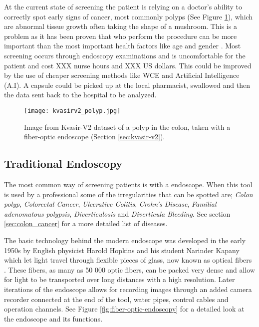 \documentclass[thesis.tex]{subfiles}
\begin{document}
At the current state of screening the patient is relying on a doctor's ability to correctly spot early signs of cancer, most commonly polyps (See Figure \ref{fig:kvasirv2_polyp}), which are abnormal tissue growth often taking the shape of a mushroom. This is a problem as it has been proven that who perform the procedure can be more important than the most important health factors like age and gender \cite{EndoscopistCan07}. Most screening occurs through endoscopy examinations and is uncomfortable for the patient and cost XXX nurse hours and XXX US dollars. %
This could be improved by the use of cheaper screening methods like WCE and Artificial Intelligence (A.I). A capsule could be picked up at the local pharmacist, swallowed and then the data sent back to the hospital to be analyzed.

\begin{figure}[h!] %
  \begin{center}
    \texttt{[image: kvasirv2\_polyp.jpg]}
    \caption[Image from Kvasir-V2 dataset of a polyp in the colon.]{Image from Kvasir-V2 dataset of a polyp in the colon, taken with a fiber-optic endoscope (Section \ref{sec:kvasir-v2}).}
    \label{fig:kvasirv2_polyp}
  \end{center}
\end{figure}



\subsection{Traditional Endoscopy}

The most common way of screening patients is with a endoscope. When this tool is used by a professional some of the irregularities that can be spotted are; \textit{Colon polyp}, \textit{Colorectal Cancer}, \textit{Ulcerative Colitis}, \textit{Crohn's Disease}, \textit{Familial adenomatous polypsis}, \textit{Diverticulosis} and \textit{Diverticula Bleeding}. See section \ref{sec:colon_cancer} for a more detailed list of diseases.

The basic technology behind the modern endoscope was developed in the early 1950s by English physicist Harold Hopkins and his student Narinder Kapany which let light travel through flexible pieces of glass, now known as optical fibers \cite{NewMethod54}. These fibers, as many as 50 000 optic fibers, can be packed very dense and allow for light to be transported over long distances with a high resolution. Later iterations of the endoscope allows for recording images through an added camera recorder connected at the end of the tool, water pipes, control cables and operation channels. See Figure \ref{fig:fiber-optic-endoscopy} for a detailed look at the endoscope and its functions.
\end{document}
